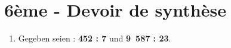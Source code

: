 



\section*{6\`eme - Devoir de synth\`ese}

\begin{multicols}{2}

\begin{enumerate}
\item Gegeben seien : \textbf{452 : 7} und \textbf{9~587 : 23}.
\end{enumerate}

\end{multicols}
